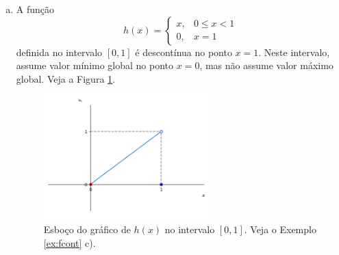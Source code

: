 \cleardoublepage\documentclass[../main.tex]{subfiles}
\begin{document}
\begin{ex}
\begin{enumerate}[a)]
\item A função
  \begin{equation}
    h(x) = \left\{
      \begin{array}{ll}
        x, & 0\leq x < 1\\
        0, & x=1
      \end{array}
\right.
\end{equation}
definida no intervalo $[0, 1]$ é descontínua no ponto $x=1$. Neste intervalo, assume valor mínimo global no ponto $x=0$, mas não assume valor máximo global. Veja a Figura \ref{fig:ex_fcont_h}.

  \begin{figure}[H]
    \centering
    \includegraphics[width=0.6\textwidth]{./fig_apl_deriv/fig_h}
    \caption{Esboço do gráfico de $h(x)$ no intervalo $[0,1]$. Veja o Exemplo \ref{ex:fcont} c).}
    \label{fig:ex_fcont_h}
  \end{figure}
  \end{enumerate}
\end{ex}
\end{document}
